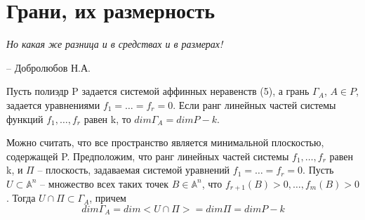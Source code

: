 \chapter{Грани, их размерность}
\label{cha:11}

\epigraph{
	\textit{Но какая же разница и в средствах и в размерах!}}
{-- Добролюбов Н.А.}

\begin{propose}\label{cha:11/propose:1}
	Пусть полиэдр P задается системой аффинных неравенств (5), а грань $\Gamma_A$, $A \in P$, задается уравнениями $f_1 = \dots = f_r = 0$. Если ранг линейных частей системы функций $f_1, \dots, f_r$ равен k, то $dim \Gamma_A = dim P − k$.
\end{propose}
\begin{Proof}
	Можно считать, что все пространство является минимальной плоскостью, содержащей P. Предположим, что ранг линейных частей системы $f_1, \dots, f_r$ равен k, и $\Pi$ – плоскость, задаваемая системой уравнений $f_1 = \dots = f_r = 0$. Пусть $U \subset \mathbb{A}^n$ – множество всех таких точек $B \in \mathbb{A}^n$, что $f_{r+1}(B) > 0, \dots, f_m(B) > 0$. Тогда $U \cap \Pi \subset \Gamma_A$, причем
	$$dim \Gamma_A = dim <U \cap \Pi> = dim \Pi = dim P - k$$
\end{Proof}

